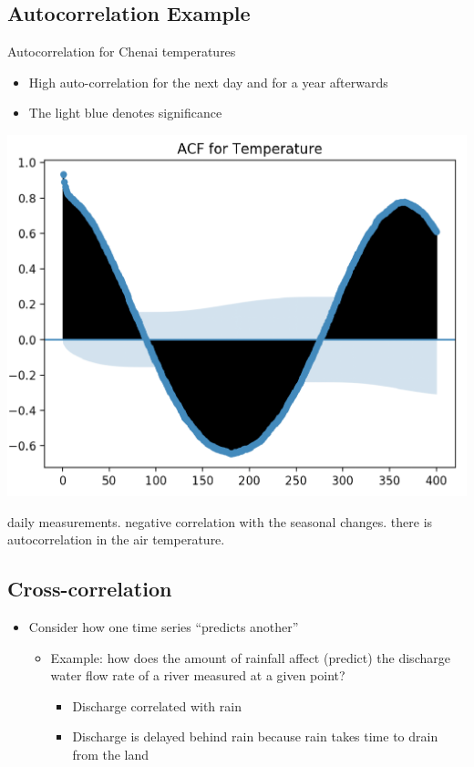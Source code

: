\documentclass[11pt]{article}
\theoremstyle{definition}
\begin{document}
\subsection{Autocorrelation Example}
Autocorrelation for
Chenai temperatures

\begin{itemize}
  \item High auto-correlation
  for the next day and
  for a year afterwards
  \item The light blue
  denotes significance
\end{itemize}

\includegraphics[width=\textwidth/2]{9.png}

daily measurements. negative correlation with the seasonal changes. there is autocorrelation
in the air temperature. 

\subsection{Cross-correlation}
\begin{itemize}
  \item Consider how one time
  series “predicts another”
  \begin{itemize}
    \item Example: how does the
    amount of rainfall affect
    (predict) the discharge water
    flow rate of a river measured
    at a given point?
    \begin{itemize}
      \item Discharge correlated with rain
      \item Discharge is delayed behind
      rain because rain takes time
      to drain from the land
    \end{itemize}
  \end{itemize}
\end{itemize}
\end{document}
